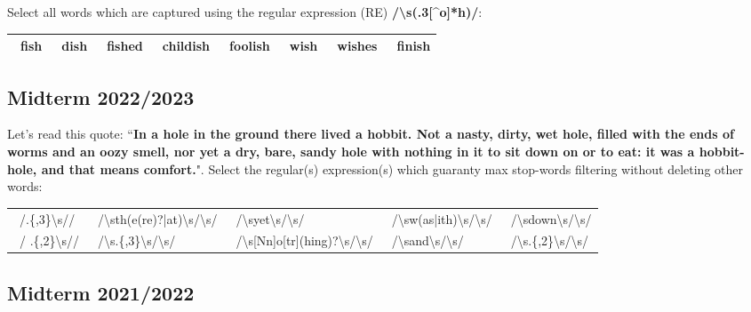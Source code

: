 \documentclass[11pt, a4paper]{article}
\begin{document}
Select all words which are captured using the regular expression (RE) \textbf{/\textbackslash s(.{3}[\textasciicircum o]*h)/}:

\begin{center}
	\begin{tabular}{|llllllll|}
	\hline
	\Square\ fish & 
	\Square\ dish & 
	\Square\ fished & 
	\Square\ childish &
	\Square\ foolish &
	\Square\ wish &
	\Square\ wishes &
	\Square\ finish \\
	\hline
\end{tabular}
\end{center}

\subsection{Midterm 2022/2023}

Let's read this quote: ``\textbf{In a hole in the ground there lived a hobbit. Not a nasty, dirty, wet hole, filled
with the ends of worms and an oozy smell, nor yet a dry, bare, sandy hole with nothing in it to sit down
on or to eat: it was a hobbit-hole, and that means comfort.}".
Select the regular(s) expression(s) which guaranty max stop-words filtering without deleting other words:

\begin{center}
	\begin{tabular}{|lllll|}
	\hline
	\Square\ /.\{,3\}\textbackslash s// & 
	\Square\ /\textbackslash sth(e(re)?|at)\textbackslash s/\textbackslash s/ & 
	\Square\ /\textbackslash syet\textbackslash s/\textbackslash s/ & 
	\Square\ /\textbackslash sw(as|ith)\textbackslash s/\textbackslash s/ &
	\Square\ /\textbackslash sdown\textbackslash s/\textbackslash s/ \\
	
	\Square\ / .\{,2\}\textbackslash s// &
	\Square\ /\textbackslash s.\{,3\}\textbackslash s/\textbackslash s/ &
	\Square\ /\textbackslash s[Nn]o[tr](hing)?\textbackslash s/\textbackslash s/ &
	\Square\ /\textbackslash sand\textbackslash s/\textbackslash s/ &
	\Square\ /\textbackslash s.\{,2\}\textbackslash s/\textbackslash s/ \\
	\hline
\end{tabular}
\end{center}

\subsection{Midterm 2021/2022}
\end{document}
